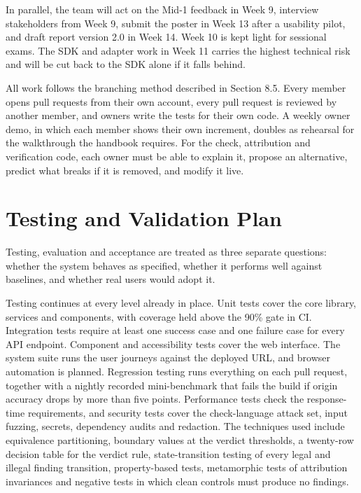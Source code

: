 \documentclass{fast-nuces-bs}
\begin{document}
In parallel, the team will act on the Mid-1 feedback in Week 9, interview stakeholders from Week 9, submit the poster in Week 13 after a usability pilot, and draft report version 2.0 in Week 14. Week 10 is kept light for sessional exams. The SDK and adapter work in Week 11 carries the highest technical risk and will be cut back to the SDK alone if it falls behind.

All work follows the branching method described in Section 8.5. Every member opens pull requests from their own account, every pull request is reviewed by another member, and owners write the tests for their own code. A weekly owner demo, in which each member shows their own increment, doubles as rehearsal for the walkthrough the handbook requires. For the check, attribution and verification code, each owner must be able to explain it, propose an alternative, predict what breaks if it is removed, and modify it live.

\section{Testing and Validation Plan}

Testing, evaluation and acceptance are treated as three separate questions: whether the system behaves as specified, whether it performs well against baselines, and whether real users would adopt it.

Testing continues at every level already in place. Unit tests cover the core library, services and components, with coverage held above the 90\% gate in CI. Integration tests require at least one success case and one failure case for every API endpoint. Component and accessibility tests cover the web interface. The system suite runs the user journeys against the deployed URL, and browser automation is planned. Regression testing runs everything on each pull request, together with a nightly recorded mini-benchmark that fails the build if origin accuracy drops by more than five points. Performance tests check the response-time requirements, and security tests cover the check-language attack set, input fuzzing, secrets, dependency audits and redaction. The techniques used include equivalence partitioning, boundary values at the verdict thresholds, a twenty-row decision table for the verdict rule, state-transition testing of every legal and illegal finding transition, property-based tests, metamorphic tests of attribution invariances and negative tests in which clean controls must produce no findings.
\end{document}
